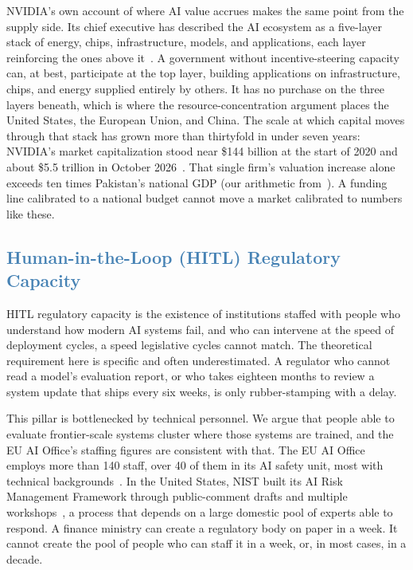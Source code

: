 \documentclass[journal]{IEEEtran}
\begin{document}
NVIDIA's own account of where AI value accrues makes the same point from the supply side. Its chief executive has described the AI ecosystem as a five-layer stack of energy, chips, infrastructure, models, and applications, each layer reinforcing the ones above it~\cite{huang2026fivelayers}.
A government without incentive-steering capacity can, at best, participate at the top layer, building applications on infrastructure, chips, and energy supplied entirely by others. It has no purchase on the three layers beneath, which is where the resource-concentration argument places the United States, the European Union, and China. The scale at which capital moves through that stack has grown more than thirtyfold in under seven years: NVIDIA's market capitalization stood near \$144 billion at the start of 2020 and about \$5.5 trillion in October 2026~\cite{nvidia2026marketcap}.
That single firm's valuation increase alone exceeds ten times Pakistan's national GDP (our arithmetic from~\cite{nvidia2026marketcap,imf2025pakistangdp}). A funding line calibrated to a national budget cannot move a market calibrated to numbers like these.

\subsection{\textcolor{steelblue}{Human-in-the-Loop (HITL) Regulatory Capacity}}

HITL regulatory capacity is the existence of institutions staffed with people who understand how modern AI systems fail, and who can intervene at the speed of deployment cycles, a speed legislative cycles cannot match. The theoretical requirement here is specific and often underestimated. A regulator who cannot read a model's evaluation report, or who takes eighteen months to review a system update that ships every six weeks, is only rubber-stamping with a delay.

This pillar is bottlenecked by technical personnel. We argue that people able to evaluate frontier-scale systems cluster where those systems are trained, and the EU AI Office's staffing figures are consistent with that. The EU AI Office employs more than 140 staff, over 40 of them in its AI safety unit, most with technical backgrounds~\cite{euaioffice2026staffing}.
In the United States, NIST built its AI Risk Management Framework through public-comment drafts and multiple workshops~\cite{nist2023airmf}, a process that depends on a large domestic pool of experts able to respond.
A finance ministry can create a regulatory body on paper in a week. It cannot create the pool of people who can staff it in a week, or, in most cases, in a decade.
\end{document}
